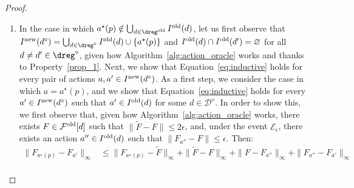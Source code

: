 \begin{proof}
\begin{enumerate}
\begin{enumerate}
		
			\item In the case in which $a^\star(p) \notin \bigcup_{d \in \dreg^{\textnormal{old}}} I^{\textnormal{old}}(d)$, let us first observe that $I^{\textnormal{new}}(d^\diamond) =  \bigcup_{d \in\dreg^\diamond } I^{\textnormal{old}}(d) \cup \{a^\star(p)\}$ and $I^\textnormal{old}(d) \cap I^\textnormal{old}(d') = \varnothing$ for all $d \neq d' \in \dreg^\diamond$, given how Algorithm~\ref{alg:action_oracle} works and thanks to Property~\ref{prop_1}.
			Next, we show that Equation~\ref{eq:inductive} holds for every pair of actions $a,a' \in  I^\textnormal{new}(d^\diamond)$.
			As a first step, we consider the case in which $a = a^\star(p)$, and we show that Equation~\ref{eq:inductive} holds for every $a' \in I^\textnormal{new}(d^\diamond)$ such that $a' \in I^\textnormal{old}(d)$ for some $d \in \mathcal{D}^\diamond$.
			In order to show this, we first observe that, given how Algorithm~\ref{alg:action_oracle} works, there exists $F \in \mathcal{F}^\textnormal{old}[d]$ such that $ \| \widetilde F - F \| \le 2 \epsilon $, and, under the event $\mathcal{E}_\epsilon$, there exists an action $a'' \in I^\textnormal{old}(d)$ such that $ \|  F_{a''} - F \| \le \epsilon $.
			Then:
			\begin{align*}
				\| F_{a^\star(p) } - F_{a'}\|_{\infty} &\le\| F_{a^\star(p) } - \widetilde F  \|_{\infty} +\| \widetilde F - F\|_{\infty} + \| F- F_{a''}  \|_{\infty}  + \| F_{a''}- F_{a'}  \|_{\infty} \\

\end{align*}
\end{enumerate}
\end{enumerate}
\end{proof}
